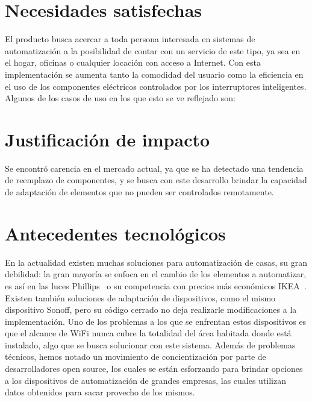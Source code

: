 \section{Necesidades satisfechas}
El producto busca acercar a toda persona interesada en sistemas de automatización a la posibilidad de contar con un servicio de este tipo, ya sea en el hogar, oficinas o cualquier locación con acceso a Internet.
Con esta implementación se aumenta tanto la comodidad del usuario como la eficiencia en el uso de los componentes eléctricos controlados por los interruptores inteligentes. Algunos de los casos de uso en los que esto se ve reflejado son:

\section{Justificación de impacto}

Se encontró carencia en el mercado actual, ya que se ha detectado una tendencia de reemplazo de componentes, y se busca con este desarrollo brindar la capacidad de adaptación de elementos que no pueden ser controlados remotamente.

\section{Antecedentes tecnológicos}

En la actualidad existen muchas soluciones para automatización de casas, su gran debilidad: la gran mayoría se enfoca en el cambio de los elementos a automatizar, es así en las luces Phillips~\cite{phillips-lighting} o su competencia con precios más económicos IKEA~\cite{ikea-lighting}. Existen también soluciones de adaptación de dispositivos, como el mismo dispositivo Sonoff, pero su código cerrado no deja realizarle modificaciones a la implementación. 
Uno de los problemas a los que se enfrentan estos dispositivos es que el alcance de WiFi nunca cubre la totalidad del área habitada donde está instalado, algo que se busca solucionar con este sistema. Además de problemas técnicos, hemos notado un movimiento de concientización por parte de desarrolladores open source, los cuales se están esforzando para brindar opciones a los dispositivos de automatización de grandes empresas, las cuales utilizan datos obtenidos para sacar provecho de los mismos.

